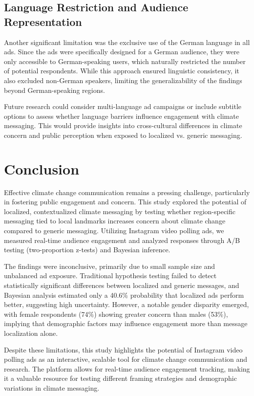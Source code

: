 \documentclass[a4paper,11pt]{article}
\begin{document}
\subsection{Language Restriction and Audience Representation}
Another significant limitation was the exclusive use of the German language in all ads. Since the ads were specifically designed for a German audience, they were only accessible to German-speaking users, which naturally restricted the number of potential respondents. While this approach ensured linguistic consistency, it also excluded non-German speakers, limiting the generalizability of the findings beyond German-speaking regions.

Future research could consider multi-language ad campaigns or include subtitle options to assess whether language barriers influence engagement with climate messaging. This would provide insights into cross-cultural differences in climate concern and public perception when exposed to localized vs. generic messaging.

\section{Conclusion}
Effective climate change communication remains a pressing challenge, particularly in fostering public engagement and concern. This study explored the potential of localized, contextualized climate messaging by testing whether region-specific messaging tied to local landmarks increases concern about climate change compared to generic messaging. Utilizing Instagram video polling ads, we measured real-time audience engagement and analyzed responses through A/B testing (two-proportion z-tests) and Bayesian inference.

The findings were inconclusive, primarily due to small sample size and unbalanced ad exposure. Traditional hypothesis testing failed to detect statistically significant differences between localized and generic messages, and Bayesian analysis estimated only a 40.6\% probability that localized ads perform better, suggesting high uncertainty. However, a notable gender disparity emerged, with female respondents (74\%) showing greater concern than males (53\%), implying that demographic factors may influence engagement more than message localization alone.

Despite these limitations, this study highlights the potential of Instagram video polling ads as an interactive, scalable tool for climate change communication and research. The platform allows for real-time audience engagement tracking, making it a valuable resource for testing different framing strategies and demographic variations in climate messaging.


\end{document}

